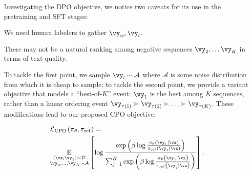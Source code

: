 Investigating the DPO objective, we notice two caveats for its use in the pretraining and SFT stages: 
\begin{enumerate*}[series = tobecont, itemjoin = \quad]
	\item We need human labelers to gather $\vy_w, \vy_l$.
	\item There may not be a natural ranking among negative sequences $\vy_2,\ldots\vy_K$ in terms of text quality.
\end{enumerate*}
To tackle the first point, we sample $\vy_l\sim\mathcal{A}$ where $\mathcal{A}$ is some noise distribution from which it is cheap to sample; to tackle the second point, we provide a variant objective that models a ``best-of-$K$'' event: $\vy_1$ is the best among $K$ sequences, rather than a linear ordering event $\vy_{\tau(1)}\succ \vy_{\tau(2)}\succ \ldots\succ \vy_{\tau(K)}$.
These modifications lead to our proposed CPO objective:

\begin{align}\label{eq:norankcpo}
\begin{split}
		&\mathcal{L}_{\mathrm{CPO}}\left(\pi_\theta, \pi_{\mathrm{ref}}\right)=\\
		&\underset{\substack{ (\vx,\vy_1) \sim \mathcal{D} \\  \vy_2, \ldots, \vy_K\sim\mathcal{A}} }{\mathbb{E}} \left[\log \frac{\exp \left(\beta \log \frac{\pi_\theta\left(\vy_1 \mid \vx\right)}{\pi_{\mathrm{ref}}\left(\vy_1 \mid \vx\right)}\right)}{\sum_{j=1}^K \exp \left(\beta \log \frac{\pi_\theta\left(\vy_j \mid \vx\right)}{\pi_{\mathrm{ref}}\left(\vy_j \mid \vx\right)}\right)}\right].
\end{split}
\end{align}


